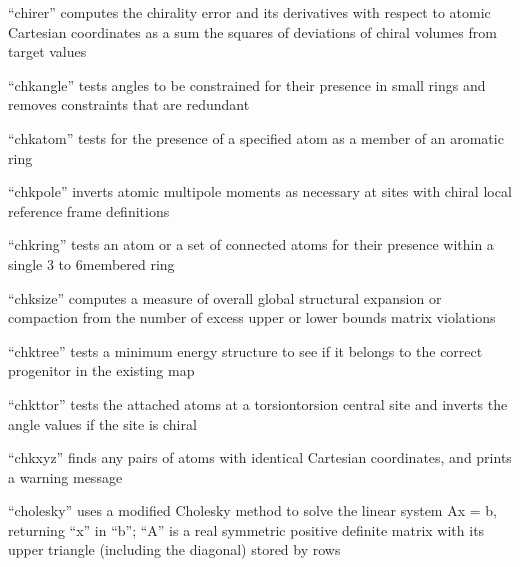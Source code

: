 \documentclass[letterpaper,11pt,english]{sphinxmanual}
\begin{document}


“chirer” computes the chirality error and its derivatives
with respect to atomic Cartesian coordinates as a sum the
squares of deviations of chiral volumes from target values


“chkangle” tests angles to be constrained for their presence
in small rings and removes constraints that are redundant


“chkatom” tests for the presence of a specified atom as a
member of an aromatic ring


“chkpole” inverts atomic multipole moments as necessary
at sites with chiral local reference frame definitions


“chkring” tests an atom or a set of connected atoms for
their presence within a single 3\sphinxhyphen{} to 6\sphinxhyphen{}membered ring


“chksize” computes a measure of overall global structural
expansion or compaction from the number of excess upper
or lower bounds matrix violations



“chktree” tests a minimum energy structure to see if it
belongs to the correct progenitor in the existing map


“chkttor” tests the attached atoms at a torsion\sphinxhyphen{}torsion central
site and inverts the angle values if the site is chiral


“chkxyz” finds any pairs of atoms with identical Cartesian
coordinates, and prints a warning message


“cholesky” uses a modified Cholesky method to solve the linear
system Ax = b, returning “x” in “b”; “A” is a real symmetric
positive definite matrix with its upper triangle (including the
diagonal) stored by rows
\end{document}

